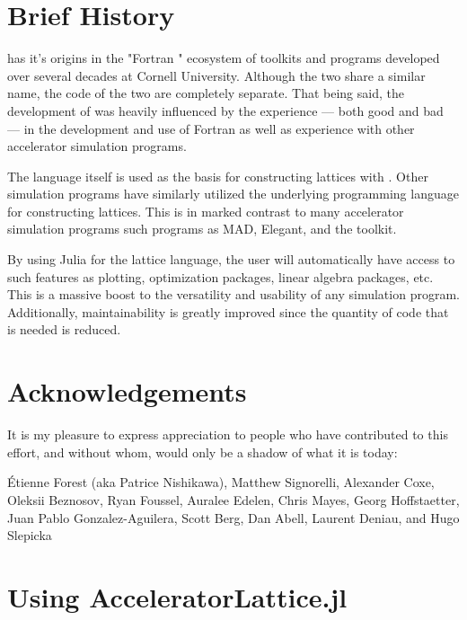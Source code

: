 \section{Brief History}

\bmadjl has it's origins in the "Fortran \bmad" ecosystem of toolkits and programs developed over several
decades at Cornell University. Although the two share a similar name, the code of the two are
completely separate. That being said, the development of \accellat was heavily influenced by the 
experience --- both good and bad --- in the development and use of Fortran \bmad as well as experience
with other accelerator simulation programs.

The \julia language itself is used as the basis for constructing lattices with \accellat. 
Other simulation programs
have similarly utilized the underlying programming language for constructing 
lattices\cite{Appleby:Merlin2020,Iadarola:Xsuite2023}. This is in marked contrast to many accelerator
simulation programs such programs as MAD\cite{Grote:MAD1989}, Elegant\cite{Borland:Elegant2000}, and the 
\bmad toolkit\cite{Sagan:Bmad2006}. 

By using Julia for the lattice language, the user will automatically have access to such features 
as plotting, optimization packages, linear algebra packages, etc. 
This is a massive boost to the versatility and usability of any \bmadjl simulation program. 
Additionally, maintainability is greatly improved since the quantity of code that is needed is reduced.

\section{Acknowledgements}

It is my pleasure to express appreciation to people who have contributed to this effort, and without
whom, \bmadjl would only be a shadow of what it is today: 

\'Etienne Forest (aka Patrice Nishikawa),
Matthew Signorelli,
Alexander Coxe,
Oleksii Beznosov,
Ryan Foussel,
Auralee Edelen,
Chris Mayes,
Georg Hoffstaetter,
Juan Pablo Gonzalez-Aguilera,
Scott Berg,
Dan Abell,
Laurent Deniau, and
Hugo Slepicka

\section{Using AcceleratorLattice.jl}

